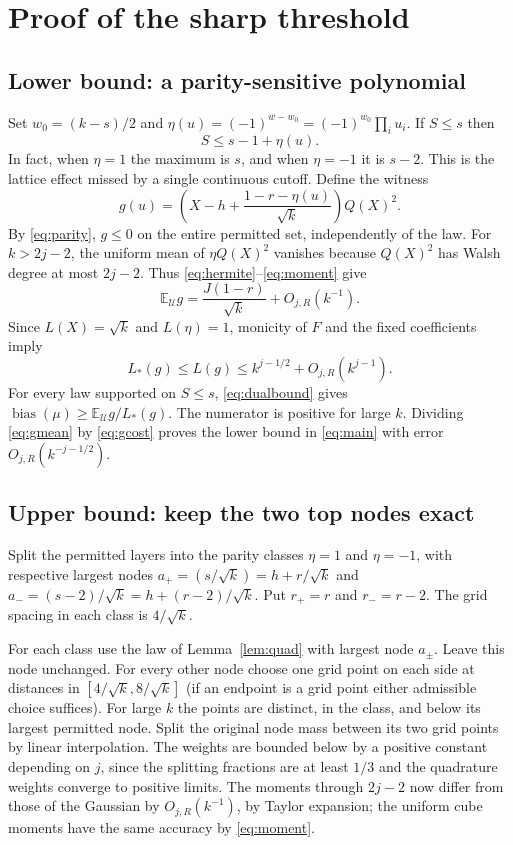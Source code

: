\documentclass[11pt]{article}
\theoremstyle{remark}\newtheorem{remark}[theorem]{Remark}
\newcommand{\E}{\mathbb E}
\newcommand{\U}{\mathcal U}
\newcommand{\bias}{\operatorname{bias}}
\begin{document}
\section{Proof of the sharp threshold}
\subsection{Lower bound: a parity-sensitive polynomial}
Set $w_0=(k-s)/2$ and $\eta(u)=(-1)^{w-w_0}=(-1)^{w_0}\prod_i u_i$. If $S\le s$ then
\begin{equation}\label{eq:parity}
 S\le s-1+\eta(u).
\end{equation}
In fact, when $\eta=1$ the maximum is $s$, and when $\eta=-1$ it is $s-2$. This is the lattice effect missed by a single continuous cutoff. Define the witness
\begin{equation}\label{eq:witness}
 g(u)=\left(X-h+\frac{1-r-\eta(u)}{\sqrt{k}}\right)Q(X)^2.
\end{equation}
By \eqref{eq:parity}, $g\le0$ on the entire permitted set, independently of the law. For $k>2j-2$, the uniform mean of $\eta Q(X)^2$ vanishes because $Q(X)^2$ has Walsh degree at most $2j-2$. Thus \eqref{eq:hermite}--\eqref{eq:moment} give
\begin{equation}\label{eq:gmean}
 \E_\U g=\frac{J(1-r)}{\sqrt{k}}+O_{j,R}(k^{-1}).
\end{equation}
Since $L(X)=\sqrt{k}$ and $L(\eta)=1$, monicity of $F$ and the fixed coefficients imply
\begin{equation}\label{eq:gcost}
 L_*(g)\le L(g)\le k^{j-1/2}+O_{j,R}(k^{j-1}).
\end{equation}
For every law supported on $S\le s$, \eqref{eq:dualbound} gives $\bias(\mu)\ge \E_\U g/L_*(g)$. The numerator is positive for large $k$. Dividing \eqref{eq:gmean} by \eqref{eq:gcost} proves the lower bound in \eqref{eq:main} with error $O_{j,R}(k^{-j-1/2})$.

\subsection{Upper bound: keep the two top nodes exact}
Split the permitted layers into the parity classes $\eta=1$ and $\eta=-1$, with respective largest nodes $a_+=(s/\sqrt{k})=h+r/\sqrt{k}$ and $a_-=(s-2)/\sqrt{k}=h+(r-2)/\sqrt{k}$. Put $r_+=r$ and $r_-=r-2$. The grid spacing in each class is $4/\sqrt{k}$.

For each class use the law of Lemma~\ref{lem:quad} with largest node $a_\pm$. Leave this node unchanged. For every other node choose one grid point on each side at distances in $[4/\sqrt{k},8/\sqrt{k}]$ (if an endpoint is a grid point either admissible choice suffices). For large $k$ the points are distinct, in the class, and below its largest permitted node. Split the original node mass between its two grid points by linear interpolation. The weights are bounded below by a positive constant depending on $j$, since the splitting fractions are at least $1/3$ and the quadrature weights converge to positive limits. The moments through $2j-2$ now differ from those of the Gaussian by $O_{j,R}(k^{-1})$, by Taylor expansion; the uniform cube moments have the same accuracy by \eqref{eq:moment}.
\end{document}
